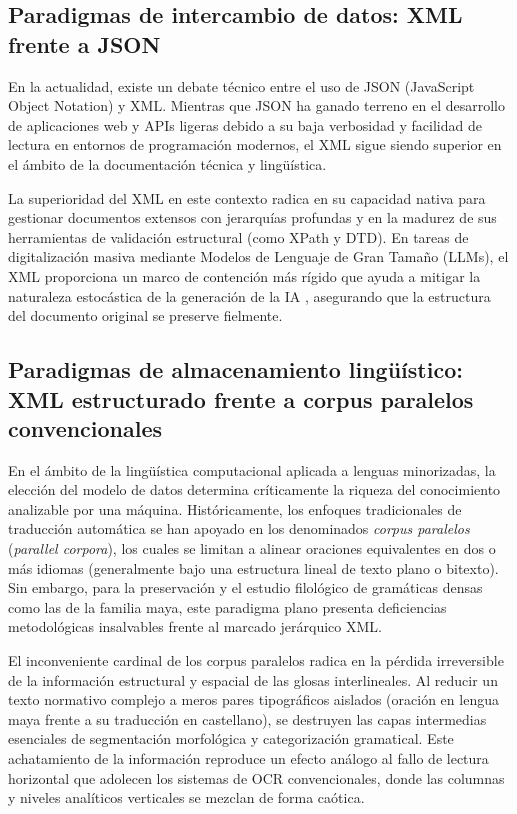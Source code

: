 \subsection{Paradigmas de intercambio de datos: XML frente a JSON}

En la actualidad, existe un debate técnico entre el uso de JSON (JavaScript Object Notation) y XML. Mientras que JSON ha ganado terreno en el desarrollo de aplicaciones web y APIs ligeras debido a su baja verbosidad y facilidad de lectura en entornos de programación modernos, el XML sigue siendo superior en el ámbito de la documentación técnica y lingüística.

La superioridad del XML en este contexto radica en su capacidad nativa para gestionar documentos extensos con jerarquías profundas y en la madurez de sus herramientas de validación estructural (como XPath y DTD). En tareas de digitalización masiva mediante Modelos de Lenguaje de Gran Tamaño (LLMs), el XML proporciona un marco de contención más rígido que ayuda a mitigar la naturaleza estocástica de la generación de la IA \parencite{jearian2026scenario}, asegurando que la estructura del documento original se preserve fielmente.

\subsection{Paradigmas de almacenamiento lingüístico: XML estructurado frente a corpus paralelos convencionales}

En el ámbito de la lingüística computacional aplicada a lenguas minorizadas, la elección del modelo de datos determina críticamente la riqueza del conocimiento analizable por una máquina. Históricamente, los enfoques tradicionales de traducción automática se han apoyado en los denominados \textit{corpus paralelos} (\textit{parallel corpora}), los cuales se limitan a alinear oraciones equivalentes en dos o más idiomas (generalmente bajo una estructura lineal de texto plano o bitexto). Sin embargo, para la preservación y el estudio filológico de gramáticas densas como las de la familia maya, este paradigma plano presenta deficiencias metodológicas insalvables frente al marcado jerárquico XML.

El inconveniente cardinal de los corpus paralelos radica en la pérdida irreversible de la información estructural y espacial de las glosas interlineales. Al reducir un texto normativo complejo a meros pares tipográficos aislados (oración en lengua maya frente a su traducción en castellano), se destruyen las capas intermedias esenciales de segmentación morfológica y categorización gramatical. Este achatamiento de la información reproduce un efecto análogo al fallo de lectura horizontal que adolecen los sistemas de OCR convencionales, donde las columnas y niveles analíticos verticales se mezclan de forma caótica.

